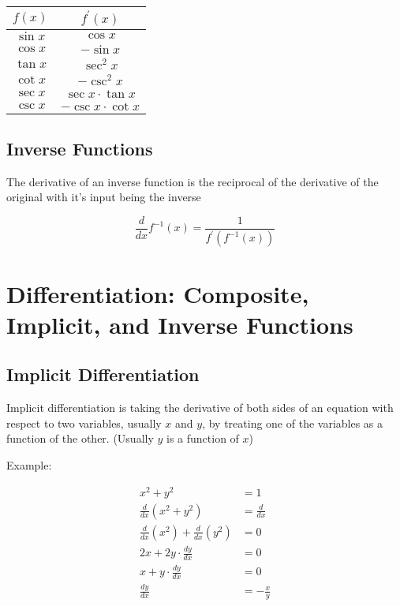 \documentclass[12pt]{article}
\begin{document}
         
        \begin{center}
            \begin{tabular}{ | c |  c  |}
                \hline
                $f(x)$ & $f^{\prime}(x)$ \\
                \hline
                $\sin x$ & $\cos x$ \\
                \hline
                $\cos x$ & $-\sin x$ \\
                \hline
                $\tan x$ & $\sec^2 x$ \\
                \hline
                $\cot x$ & $-\csc^2 x$ \\
                \hline
                $\sec x$ & $\sec x \cdot \tan x$ \\
                \hline
                $\csc x$ & $-\csc x \cdot \cot x$ \\
                \hline
             \end{tabular}
        \end{center}

        \subsection{Inverse Functions}

        The derivative of an inverse function is the reciprocal of the 
        derivative of the original with it's input being the inverse

        \[
                \frac{d}{dx} f^{-1}(x) = \frac{1}{f^{\prime}(f^{-1}(x))}   
        \]

        \section{Differentiation: Composite, Implicit, and Inverse Functions}

        \subsection{Implicit Differentiation}

        Implicit differentiation is taking the derivative of both sides of an equation with respect to
        two variables, usually $x$ and $y$, by treating one of the variables as a function of the other. 
        (Usually $y$ is a function of $x$)

        \noindent Example:

        \[
            \begin{aligned}
                x^2 + y^2 &= 1 \\
                \frac{d}{dx} (x^2 + y^2) &= \frac{d}{dx} \\
                \frac{d}{dx} (x^2) + \frac{d}{dx} (y^2) &= 0 \\
                2x + 2y \cdot \frac{dy}{dx} &= 0 \\
                x + y \cdot \frac{dy}{dx} &= 0 \\
                \frac{dy}{dx} &= -\frac{x}{y}
            \end{aligned}
        \]
\end{document}
